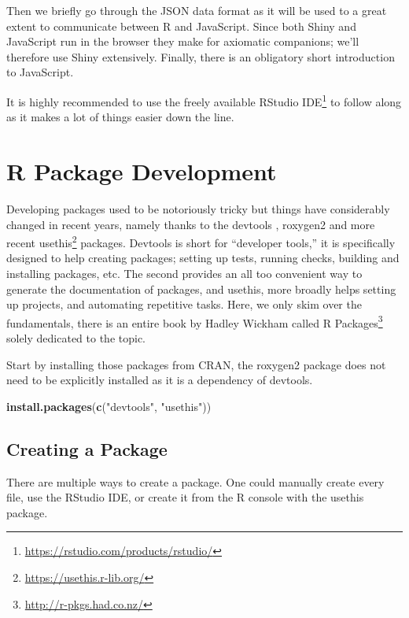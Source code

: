 \documentclass[
]{krantz}
\makeatletter
\newenvironment{Shaded}{\begin{snugshade}}{\end{snugshade}}
\newcommand{\KeywordTok}[1]{\textcolor[rgb]{0.27,0.27,0.27}{\textbf{#1}}}
\newcommand{\NormalTok}[1]{#1}
\newcommand{\StringTok}[1]{\textcolor[rgb]{0.5,0.5,0.5}{#1}}
\renewcommand{\href}[2]{#2\footnote{\url{#1}}}
\newenvironment{kframe}{%
\medskip{}
\setlength{\fboxsep}{.8em}
 \def\at@end@of@kframe{}%
 \ifinner\ifhmode%
  \def\at@end@of@kframe{\end{minipage}}%
  \begin{minipage}{\columnwidth}%
 \fi\fi%
 \def\FrameCommand##1{\hskip\@totalleftmargin \hskip-\fboxsep
 \colorbox{shadecolor}{##1}\hskip-\fboxsep
     \hskip-\linewidth \hskip-\@totalleftmargin \hskip\columnwidth}%
 \MakeFramed {\advance\hsize-\width
   \@totalleftmargin\z@ \linewidth\hsize
   \@setminipage}}%
 {\par\unskip\endMakeFramed%
 \at@end@of@kframe}
\renewenvironment{Shaded}{\begin{kframe}}{\end{kframe}}
\makeatother
\begin{document}
Then we briefly go through the JSON data format as it will be used to a great extent to communicate between R and JavaScript. Since both Shiny and JavaScript run in the browser they make for axiomatic companions; we'll therefore use Shiny extensively. Finally, there is an obligatory short introduction to JavaScript.

It is highly recommended to use the freely available \href{https://rstudio.com/products/rstudio/}{RStudio IDE} to follow along as it makes a lot of things easier down the line.

\hypertarget{basics-pacakge-dev}{%
\section{R Package Development}\label{basics-pacakge-dev}}

Developing packages used to be notoriously tricky but things have considerably changed in recent years, namely thanks to the devtools \citep{R-devtools}, roxygen2 \citep{R-roxygen2} and more recent \href{https://usethis.r-lib.org/}{usethis} \citep{R-usethis} packages. Devtools is short for ``developer tools,'' it is specifically designed to help creating packages; setting up tests, running checks, building and installing packages, etc. The second provides an all too convenient way to generate the documentation of packages, and usethis, more broadly helps setting up projects, and automating repetitive tasks. Here, we only skim over the fundamentals, there is an entire book by Hadley Wickham called \href{http://r-pkgs.had.co.nz/}{R Packages} solely dedicated to the topic.

Start by installing those packages from CRAN, the roxygen2 package does not need to be explicitly installed as it is a dependency of devtools.

\begin{Shaded}
\begin{Highlighting}[]
\KeywordTok{install.packages}\NormalTok{(}\KeywordTok{c}\NormalTok{(}\StringTok{"devtools"}\NormalTok{, }\StringTok{"usethis"}\NormalTok{))}
\end{Highlighting}
\end{Shaded}

\hypertarget{basics-create-pkg}{%
\subsection{Creating a Package}\label{basics-create-pkg}}

There are multiple ways to create a package. One could manually create every file, use the RStudio IDE, or create it from the R console with the usethis \citep{R-usethis} package.
\end{document}
